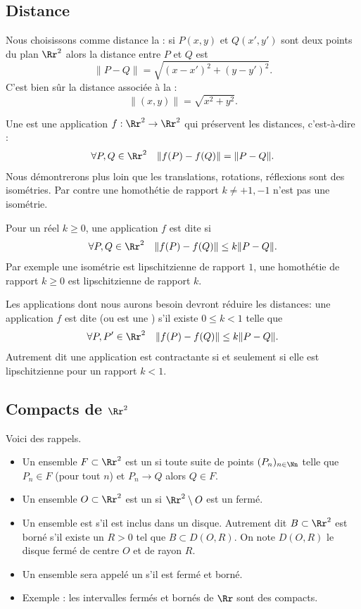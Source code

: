 \documentclass[11pt,class=report,crop=false]{standalone}
\begin{document}
\subsection{Distance}

Nous choisissons comme distance la  : si $P(x,y)$
et $Q(x',y')$ sont deux points du plan $\Rr^2$ alors la distance entre 
$P$ et $Q$ est
$$\| P - Q\| = \sqrt{(x-x')^2+(y-y')^2}.$$
C'est bien sûr la distance associée à la  :
$$\|(x,y)\| = \sqrt{x^2+y^2}.$$

Une  est une application $f : \Rr^2 \to \Rr^2$ qui
préservent les distances, c'est-à-dire :
$$\forall P,Q \in \Rr^2 \quad \|f(P)-f(Q)\| = \|P-Q\|.$$
Nous démontrerons plus loin que les translations, rotations, réflexions sont des isométries.
Par contre une homothétie de rapport $k\neq +1,-1$ n'est pas une isométrie.


Pour un réel $k\ge 0$, une application $f$ est dite 
si 
$$\forall P,Q \in\Rr^2 \quad \|f(P)-f(Q)\| \le k \|P-Q\|.$$
Par exemple  une isométrie est lipschitzienne de rapport $1$,
une homothétie de rapport $k\ge 0$
est lipschitzienne de rapport $k$.

Les applications dont nous aurons besoin devront réduire les distances:
une application $f$ est dite  (ou est une ) s'il existe $0 \le k<1$
telle que 
$$\forall P,P' \in\Rr^2 \quad \|f(P)-f(Q)\| \le k \|P-Q\|.$$
Autrement dit une application est contractante si et seulement si elle est lipschitzienne
pour un rapport $k<1$.

\subsection{Compacts de $\Rr^2$}

Voici des rappels.

\begin{itemize}
  \item Un ensemble $F\subset \Rr^2$ est un  si toute suite de points $(P_n)_{n\in\Nn}$
telle que $P_n \in F$ (pour tout $n$) et $P_n \to Q$ alors $Q\in F$.
  \item Un ensemble $O \subset \Rr^2$ est un  si $\Rr^2 \setminus O$ est un fermé.
  \item Un ensemble est  s'il est inclus dans un disque. 
Autrement dit $B \subset \Rr^2$  est borné s'il existe un $R>0$ tel que $B \subset D(O,R)$.
On note $D(O,R)$ le disque fermé de centre $O$ et de rayon $R$.
  \item Un ensemble sera appelé un  s'il est fermé et borné.
  \item Exemple : les intervalles fermés et bornés de $\Rr$ sont des compacts.
\end{itemize}
\end{document}
